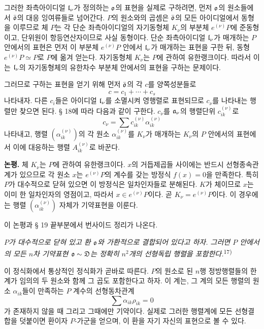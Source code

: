 그러한 좌측아이디얼 \(\mathfrak l_\nu\)가 정의하는 \(\mathfrak o\)의 표현을 실제로 구하려면, 먼저 \(\mathfrak o\)의 원소들에서 \(\bar{\mathfrak o}\)의 대응 잉여류들로 넘어간다. \(P\)의 원소와의 곱셈은 \(\bar{\mathfrak o}\)의 모든 아이디얼에서 동형을 이루므로 체 \(P\)는 각 단순 좌측아이디얼의 자기동형체 \(K_\nu\)의 부분체 \(e^{(\nu)}P\)에 준동형이고, 단위원이 항등연산자이므로 사실 동형이다. 단순 좌측아이디얼 \(\mathfrak l_\nu\)가 매개하는 \(P\) 안에서의 표현은 먼저 이 부분체 \(e^{(\nu)}P\) 안에서 \(\mathfrak l_\nu\)가 매개하는 표현을 구한 뒤, 동형 \(e^{(\nu)}P\simeq P\)로 \(P\)에 옮겨 얻는다. 자기동형체 \(K_\nu\)는 \(P\)에 관하여 유한랭크이다. 따라서 이는 \(\mathfrak l_\nu\)의 자기동형체의 유한차수 부분체 안에서의 표현을 구하는 문제이다.

그러므로 구하는 표현을 얻기 위해 먼저 \(\bar{\mathfrak o}\)의 각 \(c\)를 양쪽성분들로
\[
        c=c_1+\cdots+c_s
\]
나타내자. 다른 \(c_i\)들은 아이디얼 \(\mathfrak l_\nu\)를 소멸시켜 영행렬로 표현되므로 \(c_\nu\)를 나타내는 행렬만 찾으면 된다. § 18에 따라 다음과 같이 구한다. \(c_\nu\)를 \(\mathfrak{a}_\nu\)의 행렬단위 \(c_{ik}^{(\nu)}\)로
\[
        c_\nu=\sum c_{ik}^{(\nu)}\alpha_{ik}^{(\nu)}
\]
나타내고, 행렬 \((\alpha_{ik}^{(\nu)})\)의 각 원소 \(\alpha_{ik}^{(\nu)}\)를 \(K_\nu\)가 매개하는 \(K_\nu\)의 \(P\) 안에서의 표현에서 이에 대응하는 행렬 \(A_{ik}^{(\nu)}\)로 바꾼다.

\textbf{논평.} 체 \(K_\nu\)는 \(P\)에 관하여 유한랭크이다. \(x\)의 거듭제곱들 사이에는 반드시 선형종속관계가 있으므로 각 원소 \(x\)는 \(e^{(\nu)}P\)의 계수를 갖는 방정식 \(f(x)=0\)을 만족한다. 특히 \(P\)가 대수적으로 닫혀 있으면 이 방정식은 일차인자들로 분해된다. \(K\)가 체이므로 \(x\)는 이미 한 일차인자의 영점이고, 따라서 \(x\in e^{(\nu)}P\)이다. 곧 \(K_\nu=e^{(\nu)}P\)이다. 이 경우에는 행렬 \((\alpha_{ik}^{(\nu)})\) 자체가 기약표현을 이룬다.

이 논평과 § 19 끝부분에서 \glqq{}번사이드 정리\grqq{}가 나온다.

\emph{\(P\)가 대수적으로 닫혀 있고 환 \(\mathfrak o\)와 가환적으로 결합되어 있다고 하자. 그러면 \(P\) 안에서의 모든 \(n\)차 기약표현 \(\mathfrak o\sim\mathfrak{D}\)는 정확히 \(n^2\)개의 선형독립 행렬을 포함한다.}\textsuperscript{17)}

이 정식화에서 통상적인 정식화가 곧바로 따른다. \glqq{}\(P\)의 원소로 된 \(n\)행 정방행렬들의 한 계가 임의의 두 원소와 함께 그 곱도 포함한다고 하자. 이 계는, 그 계의 모든 행렬의 원소 \(\alpha_{ik}\)들이 만족하는 \(P\) 계수의 선형동차관계
\[
        \sum \alpha_{ik}\rho_{ik}=0
\]
가 존재하지 않을 때 그리고 그때에만 기약이다.\grqq{} 실제로 그러한 행렬계에 모든 선형결합을 덧붙이면 환이자 \(P\)-가군을 얻으며, 이 환을 자기 자신의 표현으로 볼 수 있다.

